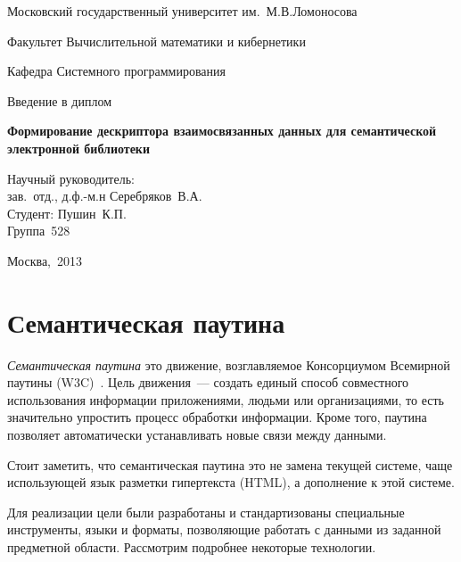 \documentclass[a4paper, final, 14 pt]{extarticle}
\begin{document}
\begin{titlepage}
  \centerline{Московский государственный университет им.~М.В.Ломоносова}
  \centerline{Факультет Вычислительной математики и кибернетики}
  \smallskip
  \small
  \centerline{Кафедра Системного программирования}
  \centerline{\hfill\hrulefill\hrulefill\hfill}
  \vfill
  \vfill
  \vfill
  \Large
  \centerline{Введение в диплом}
  \Large
  \begin{centering}
  {\bf Формирование дескриптора взаимосвязанных данных для семантической электронной библиотеки\\}
  \end{centering}
  \normalsize
  \vfill
  \vfill
  \vfill
  \vfill
  \begin{flushright}
  Научный руководитель:\\ зав.~отд., д.ф.-м.н Серебряков~В.А.\\
  \vfill
  Студент: Пушин~К.П.\\
  Группа~528\\
  \end{flushright}
  \vfill
  \vfill
  \vfill
  \centerline{Москва,~2013}
\end{titlepage}

\setcounter{page}{2}

\setcounter{tocdepth}{2}
\tableofcontents
\clearpage


\section{Семантическая паутина}

\emph{Семантическая паутина} это движение, возглавляемое Консорциумом 
Всемирной паутины (W3C)~\cite{article:semweb}. Цель движения~--- создать единый способ совместного 
использования информации приложениями, людьми или организациями, то есть значительно упростить 
процесс обработки информации. Кроме того, паутина позволяет автоматически устанавливать новые связи 
между данными.

Стоит заметить, что семантическая паутина это не замена текущей системе, чаще использующей язык 
разметки гипертекста (HTML), а дополнение к этой системе.

Для реализации цели были разработаны и стандартизованы специальные инструменты, языки и форматы, 
позволяющие работать с данными из заданной предметной области. Рассмотрим подробнее некоторые 
технологии.
\end{document}
